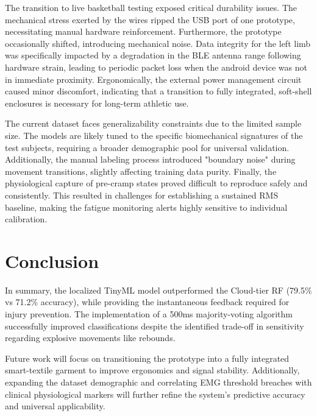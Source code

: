 \documentclass[conference]{IEEEtran}
\begin{document}
The transition to live basketball testing exposed critical durability issues. The mechanical stress exerted by the wires ripped the USB port of one prototype, necessitating manual hardware reinforcement. Furthermore, 
the prototype occasionally shifted, introducing mechanical noise. Data integrity for the left limb was specifically impacted by a degradation in the BLE antenna range following hardware strain, leading to periodic 
packet loss when the android device was not in immediate proximity. Ergonomically, the external power management circuit caused minor discomfort, 
indicating that a transition to fully integrated, soft-shell enclosures is necessary for long-term athletic use.

The current dataset faces generalizability constraints due to the limited sample size. The models are likely tuned to the specific biomechanical signatures of the test subjects, requiring a broader demographic pool 
for universal validation. Additionally, the manual labeling process introduced "boundary noise" during movement transitions, slightly affecting training data purity. Finally, the physiological capture of pre-cramp 
states proved difficult to reproduce safely and consistently. This resulted in challenges for establishing a sustained RMS baseline, making the fatigue monitoring alerts highly sensitive to individual calibration.

\section{Conclusion}

In summary, the localized TinyML model outperformed the Cloud-tier RF (79.5\% vs 71.2\% accuracy), while providing the instantaneous feedback required for injury prevention. The implementation of a 500ms 
majority-voting algorithm successfully improved classifications despite the identified trade-off in sensitivity regarding explosive movements like rebounds.

Future work will focus on transitioning the prototype into a fully integrated smart-textile garment to improve ergonomics and signal stability. Additionally, expanding the dataset demographic and correlating EMG 
threshold breaches with clinical physiological markers will further refine the system's predictive accuracy and universal applicability.


\end{document}
